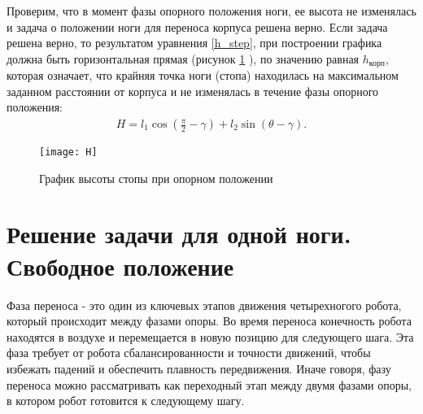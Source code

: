\newpage 
Проверим, что в момент фазы опорного положения ноги, ее высота не изменялась и задача о положении ноги для переноса корпуса решена верно. Если задача решена верно, то результатом уравнения \ref{h_step}, при построении графика должна быть горизонтальная прямая (рисунок \ref{H} ), по значению равная $h_{\text{корп}}$, которая означает, что крайняя точка ноги (стопа) находилась на максимальном заданном расстоянии от корпуса и не изменялась в течение фазы опорного положения:
\begin{equation}
	\begin{array}{l}
		H = l_{1}\cos({\frac{\pi}{2}-\gamma}) + l_{2}\sin({\theta-\gamma}).
	\end{array}
	\label{h_step}
\end{equation}
\newline
\begin{figure}[h!]
	\begin{center}
		\texttt{[image: H]}
		\caption{График высоты стопы при опорном положении}
		\label{H}
	\end{center}
\end{figure}
\newpage
\section{Решение задачи для одной ноги. Свободное положение}\label{C3_3}
Фаза переноса - это один из ключевых этапов движения четырехногого робота, который происходит между фазами опоры. Во время переноса конечность робота находятся в воздухе и перемещается в новую позицию для следующего шага. Эта фаза требует от робота сбалансированности и точности движений, чтобы избежать падений и обеспечить плавность передвижения. Иначе говоря, фазу переноса можно рассматривать как переходный этап между двумя фазами опоры, в котором робот готовится к следующему шагу.


